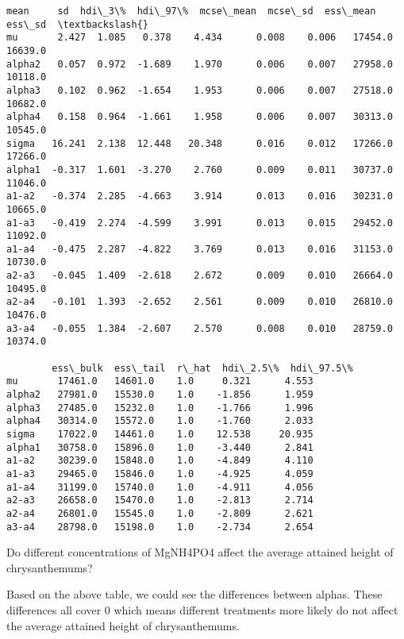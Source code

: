 \documentclass[11pt]{article}
\makeatletter
\newcommand{\boxspacing}{\kern\kvtcb@left@rule\kern\kvtcb@boxsep}
\newcommand{\prompt}[4]{
        \ttfamily\llap{{\color{#2}[#3]:\hspace{3pt}#4}}\vspace{-\baselineskip}
    }
\makeatother
\begin{document}
            \begin{tcolorbox}[breakable, size=fbox, boxrule=.5pt, pad at break*=1mm, opacityfill=0]
\prompt{Out}{outcolor}{18}{\boxspacing}
\begin{Verbatim}[commandchars=\\\{\}]
          mean     sd  hdi\_3\%  hdi\_97\%  mcse\_mean  mcse\_sd  ess\_mean   ess\_sd  \textbackslash{}
mu       2.427  1.085   0.378    4.434      0.008    0.006   17454.0  16639.0
alpha2   0.057  0.972  -1.689    1.970      0.006    0.007   27958.0  10118.0
alpha3   0.102  0.962  -1.654    1.953      0.006    0.007   27518.0  10682.0
alpha4   0.158  0.964  -1.661    1.958      0.006    0.007   30313.0  10545.0
sigma   16.241  2.138  12.448   20.348      0.016    0.012   17266.0  17266.0
alpha1  -0.317  1.601  -3.270    2.760      0.009    0.011   30737.0  11046.0
a1-a2   -0.374  2.285  -4.663    3.914      0.013    0.016   30231.0  10665.0
a1-a3   -0.419  2.274  -4.599    3.991      0.013    0.015   29452.0  11092.0
a1-a4   -0.475  2.287  -4.822    3.769      0.013    0.016   31153.0  10730.0
a2-a3   -0.045  1.409  -2.618    2.672      0.009    0.010   26664.0  10495.0
a2-a4   -0.101  1.393  -2.652    2.561      0.009    0.010   26810.0  10476.0
a3-a4   -0.055  1.384  -2.607    2.570      0.008    0.010   28759.0  10374.0

        ess\_bulk  ess\_tail  r\_hat  hdi\_2.5\%  hdi\_97.5\%
mu       17461.0   14601.0    1.0     0.321      4.553
alpha2   27981.0   15530.0    1.0    -1.856      1.959
alpha3   27485.0   15232.0    1.0    -1.766      1.996
alpha4   30314.0   15572.0    1.0    -1.760      2.033
sigma    17022.0   14461.0    1.0    12.538     20.935
alpha1   30758.0   15896.0    1.0    -3.440      2.841
a1-a2    30239.0   15848.0    1.0    -4.849      4.110
a1-a3    29465.0   15846.0    1.0    -4.925      4.059
a1-a4    31199.0   15740.0    1.0    -4.911      4.056
a2-a3    26658.0   15470.0    1.0    -2.813      2.714
a2-a4    26801.0   15545.0    1.0    -2.809      2.621
a3-a4    28798.0   15198.0    1.0    -2.734      2.654
\end{Verbatim}
\end{tcolorbox}
        
    Do different concentrations of MgNH4PO4 affect the average attained
height of chrysanthemums?

Based on the above table, we could see the differences between alphas.
These differences all cover 0 which means different treatments more
likely do not affect the average attained height of chrysanthemums.
\end{document}
